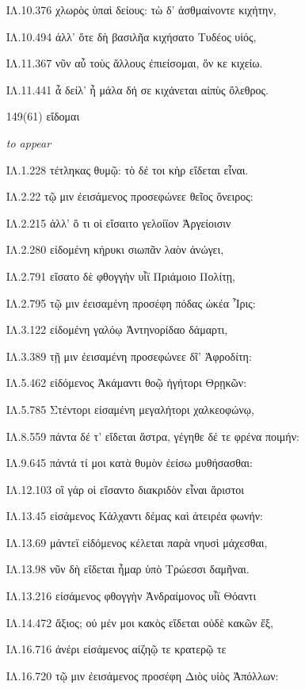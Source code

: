 \begin{enumerate}
{ΙΛ.10.376 χλωρὸς ὑπαὶ δείους: τὼ δ' ἀσθμαίνοντε κιχήτην,

ΙΛ.10.494 ἀλλ' ὅτε δὴ βασιλῆα κιχήσατο Τυδέος υἱός,

ΙΛ.11.367 νῦν αὖ τοὺς ἄλλους ἐπιείσομαι, ὅν κε κιχείω.

ΙΛ.11.441 ἆ δείλ' ἦ μάλα δή σε κιχάνεται αἰπὺς ὄλεθρος.

}

\clearpage
\item[\large 149(61)]{\large \g εἴδομαι	}

\hspace{0.2cm} \textit{ to appear }

{\g
ΙΛ.1.228 τέτληκας θυμῷ: τὸ δέ τοι κὴρ εἴδεται εἶναι.

ΙΛ.2.22 τῷ μιν ἐεισάμενος προσεφώνεε θεῖος ὄνειρος:

ΙΛ.2.215 ἀλλ' ὅ τι οἱ εἴσαιτο γελοίϊον Ἀργείοισιν

ΙΛ.2.280 εἰδομένη κήρυκι σιωπᾶν λαὸν ἀνώγει,

ΙΛ.2.791 εἴσατο δὲ φθογγὴν υἷϊ Πριάμοιο Πολίτῃ,

ΙΛ.2.795 τῷ μιν ἐεισαμένη προσέφη πόδας ὠκέα Ἶρις:

ΙΛ.3.122 εἰδομένη γαλόῳ Ἀντηνορίδαο δάμαρτι,

ΙΛ.3.389 τῇ μιν ἐεισαμένη προσεφώνεε δῖ' Ἀφροδίτη:

ΙΛ.5.462 εἰδόμενος Ἀκάμαντι θοῷ ἡγήτορι Θρῃκῶν:

ΙΛ.5.785 Στέντορι εἰσαμένη μεγαλήτορι χαλκεοφώνῳ,

ΙΛ.8.559 πάντα δέ τ' εἴδεται ἄστρα, γέγηθε δέ τε φρένα ποιμήν:

ΙΛ.9.645 πάντά τί μοι κατὰ θυμὸν ἐείσω μυθήσασθαι:

ΙΛ.12.103 οἳ γάρ οἱ εἴσαντο διακριδὸν εἶναι ἄριστοι

ΙΛ.13.45 εἰσάμενος Κάλχαντι δέμας καὶ ἀτειρέα φωνήν:

ΙΛ.13.69 μάντεϊ εἰδόμενος κέλεται παρὰ νηυσὶ μάχεσθαι,

ΙΛ.13.98 νῦν δὴ εἴδεται ἦμαρ ὑπὸ Τρώεσσι δαμῆναι.

ΙΛ.13.216 εἰσάμενος φθογγὴν Ἀνδραίμονος υἷϊ Θόαντι

ΙΛ.14.472 ἄξιος; οὐ μέν μοι κακὸς εἴδεται οὐδὲ κακῶν ἔξ,

ΙΛ.16.716 ἀνέρι εἰσάμενος αἰζηῷ τε κρατερῷ τε

ΙΛ.16.720 τῷ μιν ἐεισάμενος προσέφη Διὸς υἱὸς Ἀπόλλων:

}











\end{enumerate}
